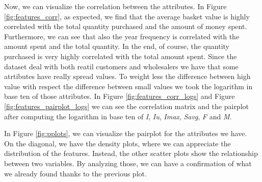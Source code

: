 Now, we can visualize the correlation between the attributes. In Figure \ref{fig:features_corr}, as expected, we find that the average basket value is highly correlated with the total quantity purchased and the amount of money spent. Furthermore, we can see that also the year frequency is correlated with the amount spent and the total quantity. In the end, of course, the quantity purchased is very highly correlated with the total amount spent. Since the dataset deal with both reatil customers and wholesalers we have that some atrtibutes have really spread values. To weight  less the difference between high value with respect the difference between small values we took the logarithm in base ten of those attributes. In Figure \ref{fig:features_corr_logs} and Figure \ref{fig:features_pairplot_logs} we can see the correlation matrix and the pairplot after computing the logarithm in base ten of \emph{I}, \emph{Iu}, \emph{Imax}, \emph{Savg}, \emph{F} and \emph{M}.

In Figure \ref{fig:pplots}, we can visualize the pairplot for the attributes we have.\\
On the diagonal, we have the density plots, where we can appreciate the distribution of the features. Instead, the other scatter plots show the relationship between two variables. By analyzing those, we can have a confirmation of what we already found thanks to the previous plot. 

